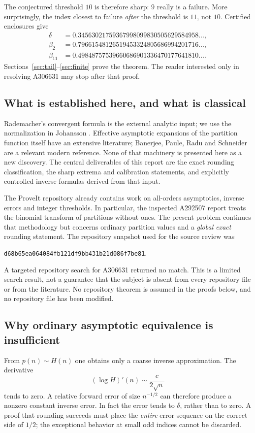 \documentclass[11pt]{article}
\numberwithin{equation}{section}
\theoremstyle{definition}
\theoremstyle{remark}
\begin{document}
The conjectured threshold $10$ is therefore sharp: $9$ really is a
failure. More surprisingly, the index closest to failure \emph{after}
the threshold is $11$, not $10$. Certified enclosures give
\begin{align*}
 \delta&=0.34563021759367998099830505629584958\ldots,\\
 \beta_2&=0.79661548126519453324805686994201716\ldots,\\
 \beta_{11}&=0.49848757539660686901336470177641810\ldots.
\end{align*}
Sections~\ref{sec:tail}--\ref{sec:finite} prove the theorem. The reader
interested only in resolving A306631 may stop after that proof.

\subsection{What is established here, and what is classical}
Rademacher's convergent formula is the external analytic input; we use
the normalization in Johansson \cite{johansson}. Effective asymptotic
expansions of the partition function itself have an extensive literature;
Banerjee, Paule, Radu and Schneider \cite{banerjee} are a relevant modern
reference. None of that machinery is presented here as a new discovery.
The central deliverables of this report are the exact rounding
classification, the sharp extrema and calibration statements, and
explicitly controlled inverse formulas derived from that input.

The ProveIt repository already contains work on all-orders asymptotics,
inverse errors and integer thresholds. In particular, the inspected
A292507 report \cite{repo292507} treats the binomial transform of
partitions without ones. The present problem continues that methodology
but concerns ordinary partition values and a \emph{global exact}
rounding statement. The repository snapshot used for the source review
was
\begin{center}
\texttt{d68b65ea064084fb121df9bb431b21d086f7be81}.
\end{center}
A targeted repository search for A306631 returned no match. This is a
limited search result, not a guarantee that the subject is absent from
every repository file or from the literature. No repository theorem is
assumed in the proofs below, and no repository file has been modified.

\subsection{Why ordinary asymptotic equivalence is insufficient}
From $p(n)\sim H(n)$ one obtains only a coarse inverse approximation.
The derivative
\[
 (\log H)'(n)\sim\frac{c}{2\sqrt n}
\]
tends to zero. A relative forward error of size $n^{-1/2}$ can therefore
produce a nonzero constant inverse error. In fact the error tends to
$\delta$, rather than to zero. A proof that rounding succeeds must place
the \emph{entire} error sequence on the correct side of $1/2$; the
exceptional behavior at small odd indices cannot be discarded.
\end{document}
